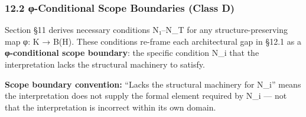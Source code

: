 \documentclass[
  11pt,
]{article}
\begin{document}
\subsubsection{12.2 φ-Conditional Scope Boundaries (Class
D)}\label{ux3c6-conditional-scope-boundaries-class-d}

Section §11 derives necessary conditions N₁--N\_T for any
structure-preserving map φ: K → B(H). These conditions re-frame each
architectural gap in §12.1 as a \textbf{φ-conditional scope boundary}:
the specific condition N\_i that the interpretation lacks the structural
machinery to satisfy.

\textbf{Scope boundary convention:} ``Lacks the structural machinery for
N\_i'' means the interpretation does not supply the formal element
required by N\_i --- not that the interpretation is incorrect within its
own domain.
\end{document}
